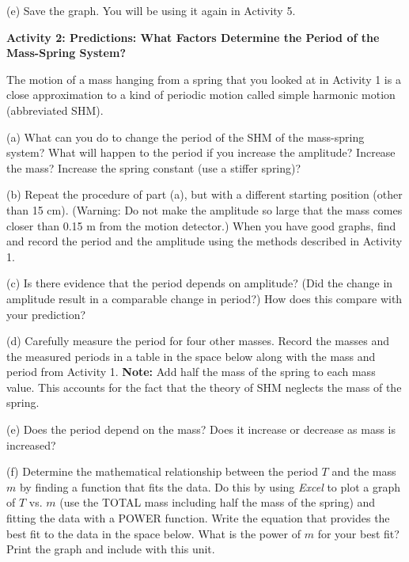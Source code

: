 (e) Save the graph. You will be using it again in Activity 5.

\bigskip

\textbf{Activity 2: Predictions:  What Factors Determine the Period of the Mass-Spring System? }

The motion of a mass hanging from a spring that you looked at in Activity 1
is a close approximation to a kind of periodic motion called simple harmonic
motion (abbreviated SHM).

(a) What can you do to change the period of the SHM of the mass-spring system? What
will happen to the period if you increase the amplitude? Increase the mass?
Increase the spring constant (use a stiffer spring)?
\answerspace{20mm}

(b) Repeat the procedure of part (a), but with a different starting position
(other than 15 cm). (Warning: Do not make the amplitude so large that the mass
comes closer than 0.15 m from the motion detector.) When you have good graphs,
find and record the period and the amplitude using the methods described in
Activity 1. 
\answerspace{15mm}


(c) Is there evidence that the period depends on amplitude? (Did the change
in amplitude result in a comparable change in period?) How does this
compare with your prediction?
\answerspace{10mm}

\pagebreak[2]
(d) Carefully measure the period for four other masses. Record the masses and
the measured periods in a table in the space below along with the mass and 
period from Activity 1. \textbf{Note:} Add half the mass of the spring to each
mass value. This accounts for the fact that the theory of SHM neglects the mass 
of the spring.
\answerspace{35mm}

(e) Does the period depend on the mass? Does it increase or decrease as mass
is increased?
\answerspace{15mm}

(f) Determine the mathematical relationship between the period $T$ and the mass
$m$ by finding a function that fits the data. Do this by using \textit{Excel} to plot 
a graph of $T$ vs. $m$ (use the TOTAL mass including half the mass of the 
spring) and fitting the data with a POWER function. Write the equation that 
provides the best fit to the data in the space below. What is the power of 
$m$ for your best fit? Print the graph and include with this unit.
\answerspace{20mm}


